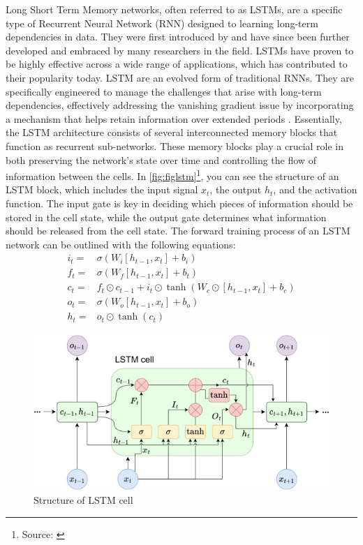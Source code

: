 \documentclass[]{interact}
\theoremstyle{plain}%
\theoremstyle{definition}
\theoremstyle{remark}
\begin{document}
Long Short Term Memory networks, often referred to as LSTMs, are a
specific type of Recurrent Neural Network (RNN) designed to learning
long-term dependencies in data. They were first introduced by
\citep{hochreiter97} and have since been further developed and embraced
by many researchers in the field. LSTMs have proven to be highly
effective across a wide range of applications, which has contributed to
their popularity today. LSTM are an evolved form of traditional RNNs.
They are specifically engineered to manage the challenges that arise
with long-term dependencies, effectively addressing the vanishing
gradient issue by incorporating a mechanism that helps retain
information over extended periods \citep{hochreiter97}. Essentially, the
LSTM architecture consists of several interconnected memory blocks that
function as recurrent sub-networks. These memory blocks play a crucial
role in both preserving the network's state over time and controlling
the flow of information between the cells. In
\autoref{fig:figlstm}\footnote{Source: \citep{KILIC2023}}, you can see
the structure of an LSTM block, which includes the input signal \(x_t\),
the output \(h_t\), and the activation function. The input gate is key
in deciding which pieces of information should be stored in the cell
state, while the output gate determines what information should be
released from the cell state. The forward training process of an LSTM
network can be outlined with the following equations: \begin{align}
i_t  =  & \sigma\left(W_i [h_{t-1}, x_t]+b_i \right)\\
f_t  = &  \sigma\left(W_f [h_{t-1}, x_t]+b_t \right) \\
c_t  = & f_t \odot c_{t-1}+i_t \odot \tanh\left(W_c \odot [h_{t-1}, x_t] +b_c \right) \\
o_t  = &  \sigma\left(W_o [h_{t-1}, x_t]+b_o \right) \\
h_t  = &  o_t\odot \tanh(c_t)
\end{align} \newline

\begin{figure}

{\centering \includegraphics[width=0.75\linewidth]{lstm} 

}

\caption{Structure of LSTM cell}\label{fig:figlstm}
\end{figure}
\end{document}
